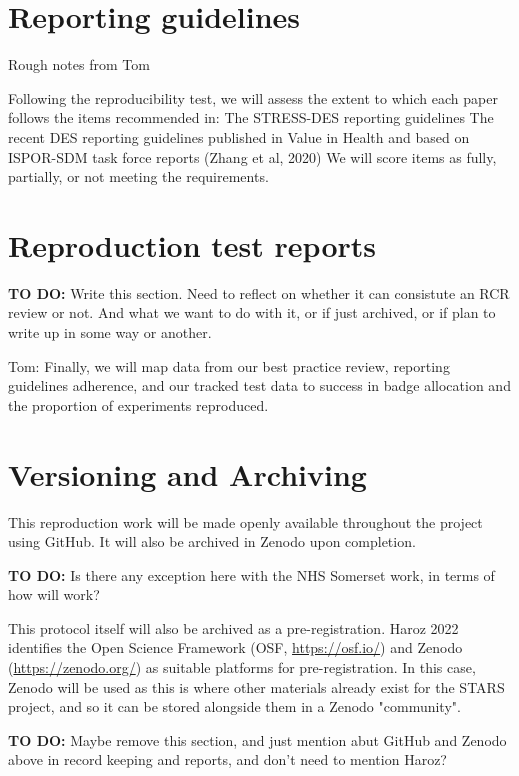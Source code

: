 \section{Reporting guidelines}

Rough notes from Tom

Following the reproducibility test, we will assess the extent to which each paper follows the items recommended in:
The STRESS-DES reporting guidelines
The recent DES reporting guidelines published in Value in Health and based on ISPOR-SDM task force reports (Zhang et al, 2020)
We will score items as fully, partially, or not meeting the requirements.

\section{Reproduction test reports}

\textbf{TO DO:} Write this section. Need to reflect on whether it can consistute an RCR review or not. And what we want to do with it, or if just archived, or if plan to write up in some way or another.

Tom: Finally, we will map data from our best practice review, reporting guidelines adherence, and our tracked test data to success in badge allocation and the proportion of experiments reproduced.

\section{Versioning and Archiving}

This reproduction work will be made openly available throughout the project using GitHub. It will also be archived in Zenodo upon completion.

\textbf{TO DO:} Is there any exception here with the NHS Somerset work, in terms of how will work?

This protocol itself will also be archived as a pre-registration. Haroz 2022 identifies the Open Science Framework (OSF, \url{https://osf.io/}) and Zenodo (\url{https://zenodo.org/}) as suitable platforms for pre-registration.\autocite{haroz_comparison_2022} In this case, Zenodo will be used as this is where other materials already exist for the STARS project, and so it can be stored alongside them in a Zenodo "community".

\textbf{TO DO:} Maybe remove this section, and just mention abut GitHub and Zenodo above in record keeping and reports, and don't need to mention Haroz?

